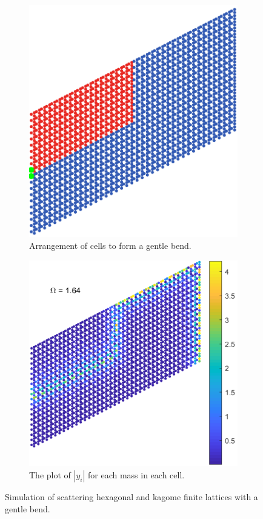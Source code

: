 \begin{figure}
\medskip
\centering
\begin{subfigure}[b]{.5\textwidth}
  \centering
  \includegraphics[width=0.8\linewidth]{imgs/kagomegentlebendarr.png}
  \caption{Arrangement of cells to form a gentle bend.}
  \label{fig:sub1}
\end{subfigure}%
\begin{subfigure}[b]{.5\textwidth}
  \centering
  \includegraphics[width=1\linewidth]{imgs/kagomegentlebendscat.png}
  \caption{The plot of $|y_i|$ for each mass in each cell.}
  \label{fig:kagomegentlebendscat}
\end{subfigure}
\caption{Simulation of scattering hexagonal and kagome finite lattices with a
  gentle bend.}
\label{fig:gentlebend}
\end{figure}

